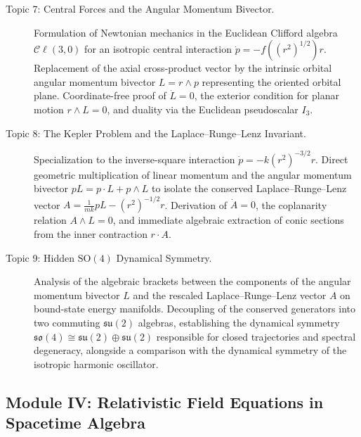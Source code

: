 \documentclass[11pt,a4paper]{article}
\newcommand{\Cl}{\mathcal{C}\ell}
\begin{document}
\begin{description}
  \item[Topic 7: Central Forces and the Angular Momentum Bivector.]
    Formulation of Newtonian mechanics in the Euclidean Clifford algebra
    $\Cl(3,0)$ for an isotropic central interaction
    $\dot{p} = -f((r^{2})^{1/2})r$. Replacement of the axial cross-product
    vector by the intrinsic orbital angular momentum bivector $L = r \wedge p$
    representing the oriented orbital plane. Coordinate-free proof of
    $\dot{L} = 0$, the exterior condition for planar motion $r \wedge L = 0$,
    and duality via the Euclidean pseudoscalar $I_{3}$.

  \item[Topic 8: The Kepler Problem and the Laplace--Runge--Lenz Invariant.]
    Specialization to the inverse-square interaction
    $\dot{p} = -k(r^{2})^{-3/2}r$. Direct geometric multiplication of linear
    momentum and the angular momentum bivector $pL = p \cdot L + p \wedge L$ to
    isolate the conserved Laplace--Runge--Lenz vector
    $A = \frac{1}{mk}pL - (r^{2})^{-1/2}r$. Derivation of $\dot{A} = 0$, the
    coplanarity relation $A \wedge L = 0$, and immediate algebraic extraction
    of conic sections from the inner contraction $r \cdot A$.

  \item[Topic 9: Hidden $\mathrm{SO}(4)$ Dynamical Symmetry.]
    Analysis of the algebraic brackets between the components of the angular
    momentum bivector $L$ and the rescaled Laplace--Runge--Lenz vector $A$ on
    bound-state energy manifolds. Decoupling of the conserved generators into
    two commuting $\mathfrak{su}(2)$ algebras, establishing the dynamical
    symmetry $\mathfrak{so}(4) \cong \mathfrak{su}(2) \oplus \mathfrak{su}(2)$
    responsible for closed trajectories and spectral degeneracy, alongside a
    comparison with the dynamical symmetry of the isotropic harmonic
    oscillator.
\end{description}

\subsection{Module IV: Relativistic Field Equations in Spacetime Algebra}
\label{subsec:mod4}
\end{document}
